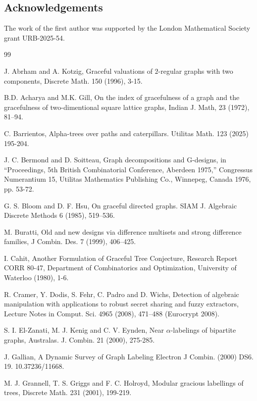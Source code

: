 \documentclass[12pt, a4paper]{article}
\theoremstyle{definition}
\begin{document}
\subsection*{Acknowledgements}
The work of the first author was supported by the London Mathematical Society grant URB-2025-54.

\begin{thebibliography}{99}

 J. Abrham and A. Kotzig,
Graceful valuations of $2$-regular graphs with two components, Discrete Math. 150 (1996), 3-15.

 B.D. Acharya and M.K. Gill, On the index of gracefulness of a graph and
the gracefulness of two-dimentional square lattice graphs, Indian J. Math, 23
(1972), 81–94.

C. Barrientos, Alpha-trees over paths and caterpillars. Utilitas Math. 123 (2025) 195-204. 

J. C. Bermond and D. Soitteau, Graph decompositions and G-designs, in “Proceedings, 
5th British Combinatorial Conference, Aberdeen 1975,” Congressus Numerantium 15, 
Utilitas Mathematics Publishing Co., Winnepeg, Canada 1976, pp. 53-72.

G. S. Bloom and D. F. Hsu, On graceful directed graphs. SIAM J. Algebraic Discrete Methods 6 (1985), 519–536.

 M. Buratti, Old and new designs via difference multisets and strong difference families, J Combin.
Des. 7 (1999), 406–425.

I. Cahit, Another Formulation of Graceful Tree Conjecture, Research Report
CORR 80-47, Department of Combinatorics and Optimization, University of
Waterloo (1980), 1-6.

  R. Cramer, Y. Dodis, S. Fehr, C. Padro and D. Wichs, Detection of algebraic manipulation with applications
to robust secret sharing and fuzzy extractors, Lecture Notes in Comput. Sci. 4965 (2008), 471–488 (Eurocrypt 2008).

S. I. El-Zanati, M. J. Kenig and C. V. Eynden, Near $\alpha$-labelings of bipartite
graphs, Australas. J. Combin. 21 (2000), 275-285.

J. Gallian, A Dynamic Survey of Graph Labeling Electron J Combin. (2000) DS6. 19. 10.37236/11668. 

M. J. Grannell, T. S. Griggs and F. C. Holroyd, Modular gracious labellings of
trees, Discrete Math. 231 (2001), 199-219.


\end{thebibliography}
\end{document}
